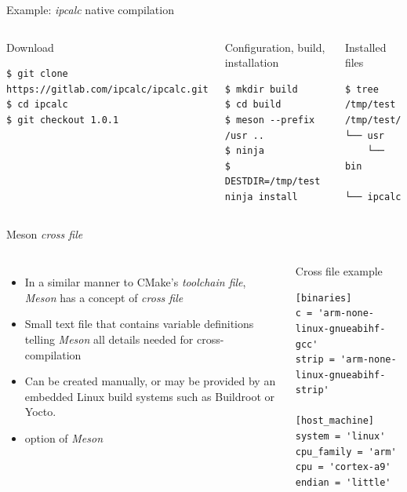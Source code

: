 \begin{frame}[fragile]{Example: {\em ipcalc} native compilation}

  \begin{columns}
    \begin{block}{Download}
      {\tiny
\begin{verbatim}
$ git clone https://gitlab.com/ipcalc/ipcalc.git
$ cd ipcalc
$ git checkout 1.0.1
\end{verbatim}
      }
    \end{block}

    \begin{block}{Configuration, build, installation}
      {\tiny
\begin{verbatim}
$ mkdir build
$ cd build
$ meson --prefix /usr ..
$ ninja
$ DESTDIR=/tmp/test ninja install
\end{verbatim}
      }
    \end{block}


    \begin{block}{Installed files}
      {\tiny
\begin{verbatim}
$ tree /tmp/test
/tmp/test/
└── usr
    └── bin
        └── ipcalc
\end{verbatim}
      }
    \end{block}
  \end{columns}
\end{frame}

\begin{frame}[fragile]{Meson {\em cross file}}
  \begin{columns}
    \begin{itemize}
    \item In a similar manner to CMake's {\em toolchain file}, {\em
        Meson} has a concept of {\em cross file}
    \item Small text file that contains variable definitions telling
      {\em Meson} all details needed for cross-compilation
    \item Can be created manually, or may be provided by an embedded
      Linux build systems such as Buildroot or Yocto.
    \item {} option of {\em Meson}
    \end{itemize}
    \begin{block}{Cross file example}
      {\tiny
\begin{verbatim}
[binaries]
c = 'arm-none-linux-gnueabihf-gcc'
strip = 'arm-none-linux-gnueabihf-strip'

[host_machine]
system = 'linux'
cpu_family = 'arm'
cpu = 'cortex-a9'
endian = 'little'
\end{verbatim}
      }
    \end{block}
  \end{columns}
\end{frame}

